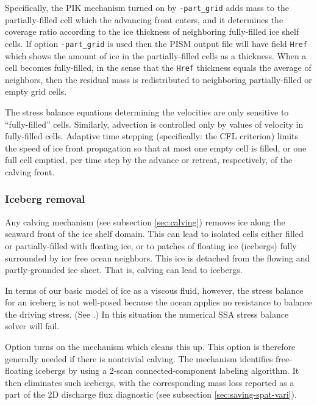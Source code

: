 Specifically, the PIK mechanism turned on by \texttt{-part_grid} adds mass to the partially-filled cell which the advancing front enters, and it determines the coverage ratio according to the ice thickness of neighboring fully-filled ice shelf cells.  If option \texttt{-part_grid} is used then the PISM output file will have field \texttt{Href} which shows the amount of ice in the partially-filled cells as a thickness.  When a cell becomes fully-filled, in the sense that the \texttt{Href} thickness equals the average of neighbors, then the residual mass is redistributed to neighboring partially-filled or empty grid cells.

The stress balance equations determining the velocities are only sensitive to ``fully-filled'' cells.  Similarly, advection is controlled only by values of velocity in fully-filled cells.  Adaptive time stepping (specifically: the CFL criterion) limits the speed of ice front propagation so that at most one empty cell is filled, or one full cell emptied, per time step by the advance or retreat, respectively, of the calving front.

\subsubsection{Iceberg removal}
\label{subsec:kill-icebergs}

Any calving mechanism (see subsection \ref{sec:calving}) removes ice along the seaward front of the ice shelf domain.  This can lead to isolated cells either filled or partially-filled with floating ice, or to patches of floating ice (icebergs) fully surrounded by ice free ocean neighbors.  This ice is detached from the flowing and partly-grounded ice sheet.  That is, calving can lead to icebergs.

In terms of our basic model of ice as a viscous fluid, however, the stress balance for an iceberg is not well-posed because the ocean applies no resistance to balance the driving stress.  (See \cite{SchoofStream}.)  In this situation the numerical SSA stress balance solver will fail.

Option  turns on the mechanism which cleans this up.  This option is therefore generally needed if there is nontrivial calving.  The mechanism identifies free-floating icebergs by using a 2-scan connected-component labeling algorithm.  It then eliminates such icebergs, with the corresponding mass loss reported as a part of the 2D discharge flux diagnostic (see subsection \ref{sec:saving-spat-vari}).


